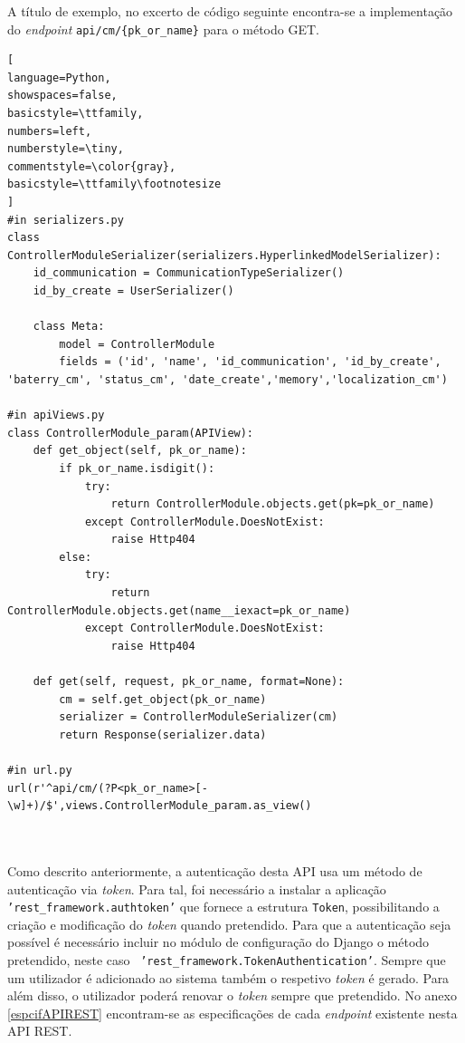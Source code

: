  
A título de exemplo, no excerto de código seguinte encontra-se a implementação do \textit{endpoint} \texttt{api/cm/\{pk\_or\_name\}} para o método GET. 

\begin{lstlisting}[
language=Python,
showspaces=false,
basicstyle=\ttfamily,
numbers=left,
numberstyle=\tiny,
commentstyle=\color{gray},
basicstyle=\ttfamily\footnotesize
]
#in serializers.py
class ControllerModuleSerializer(serializers.HyperlinkedModelSerializer):
	id_communication = CommunicationTypeSerializer()
	id_by_create = UserSerializer()

	class Meta:
		model = ControllerModule
		fields = ('id', 'name', 'id_communication', 'id_by_create', 'baterry_cm', 'status_cm', 'date_create','memory','localization_cm')

#in apiViews.py 
class ControllerModule_param(APIView):
	def get_object(self, pk_or_name):
		if pk_or_name.isdigit():
			try:
				return ControllerModule.objects.get(pk=pk_or_name)
			except ControllerModule.DoesNotExist:
				raise Http404
		else:
			try:
				return ControllerModule.objects.get(name__iexact=pk_or_name)
			except ControllerModule.DoesNotExist:
				raise Http404
	
	def get(self, request, pk_or_name, format=None):
		cm = self.get_object(pk_or_name)
		serializer = ControllerModuleSerializer(cm)
		return Response(serializer.data)

#in url.py
url(r'^api/cm/(?P<pk_or_name>[-\w]+)/$',views.ControllerModule_param.as_view()



\end{lstlisting}



Como descrito anteriormente, a autenticação desta API usa um método de autenticação via \textit{token}. Para tal, foi necessário a instalar a aplicação \texttt{'rest\_framework.authtoken'} que fornece a estrutura \texttt{Token}, possibilitando a criação e modificação do \textit{token} quando pretendido. Para que a autenticação seja possível é necessário incluir no módulo de configuração do Django o método pretendido, neste caso  \ \texttt{'rest\_framework.TokenAuthentication'}. Sempre que um utilizador é adicionado ao sistema também o respetivo \textit{token} é gerado. Para além disso, o utilizador poderá renovar o \textit{token} sempre que pretendido. No anexo \ref{espcifAPIREST} encontram-se as especificações de cada \textit{endpoint} existente nesta API REST.







